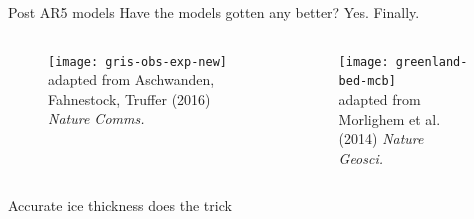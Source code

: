 \documentclass[hide notes,intlimits]{beamer}
\begin{document}
\begin{frame}{Post AR5 models}
  \alert{Have the models gotten any better? Yes. Finally.}
  \begin{columns}[c]
    \begin{column}{.6\linewidth}
    \begin{figure}
      \texttt{[image: gris-obs-exp-new]}
      \\ \tiny{adapted from Aschwanden, Fahnestock, Truffer (2016) \textit{Nature Comms.}}
    \end{figure}
    \end{column}
    \begin{column}{.4\linewidth}
      \begin{figure}
        \texttt{[image: greenland-bed-mcb]}
      \\ \tiny{adapted from Morlighem et al. (2014) \textit{Nature Geosci.}}
      \end{figure}
    \end{column}
  \end{columns}
  \alert{Accurate ice thickness does the trick}
  
\end{frame}
\end{document}
